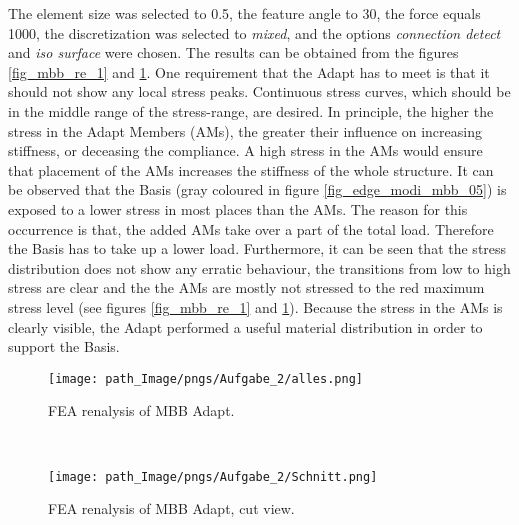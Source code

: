  The element size was selected to 0.5, the feature angle to 30,
  the force equals 1000, the discretization was 
  selected to \textit{mixed}, and the options \textit{connection detect} and \textit{iso surface}
  were chosen. The results can be obtained
  from the figures
 \ref{fig_mbb_re_1} and \ref{fig_mbb_re_2}.
One requirement that the Adapt has to meet is that it should not 
show any local stress peaks. Continuous stress curves, which should be in the middle range of the stress-range, are
 desired. In principle, the
 higher the stress in the Adapt Members (AMs), the greater their
 influence on increasing stiffness, or deceasing the compliance. A high
 stress in the AMs would ensure that
 placement of the AMs increases the stiffness of the whole
 structure. It can be observed that the Basis 
 (gray coloured in figure \ref{fig_edge_modi_mbb_05}) 
is exposed to a lower stress in most places than the AMs. The reason for
this occurrence is that, the added AMs take over a part of the total load. Therefore the Basis has to take up a lower load. Furthermore, it can be 
seen that the stress distribution 
does not show any erratic behaviour, the transitions
 from low to high stress are clear and the the AMs 
 are mostly not stressed to the red
 maximum stress level (see figures \ref{fig_mbb_re_1} and \ref{fig_mbb_re_2}).
  Because the stress in the AMs is clearly visible, the
  Adapt performed a useful material distribution in order to support
  the Basis.

\begin{figure}[!h]
 \centering
 \begin{minipage}{\textwidth}
  \centering
    \texttt{[image: path\_Image/pngs/Aufgabe\_2/alles.png]}
 	\caption{FEA renalysis of MBB Adapt.} 
 	\label{fig_mbb_re_1}
 \end{minipage}\\
 
 \vspace{0.75cm}
  \begin{minipage}{\textwidth}
 \centering
   \texttt{[image: path\_Image/pngs/Aufgabe\_2/Schnitt.png]}
 	\caption{FEA renalysis of MBB Adapt, cut view.} 
 	\label{fig_mbb_re_2}
 \end{minipage}

 \end{figure}

